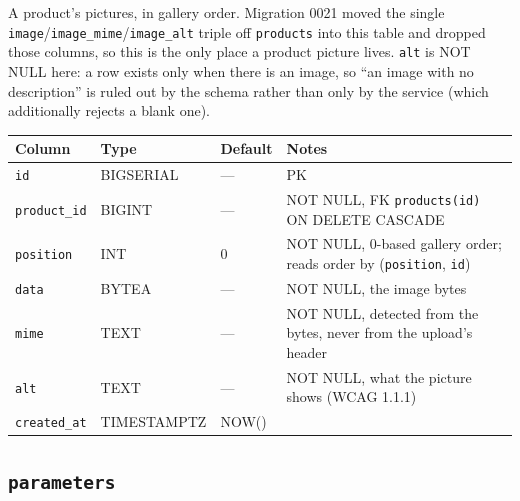 \documentclass[12pt,a4paper,twoside]{report}
\newcommand{\code}[1]{\texttt{#1}}
\begin{document}
A product's pictures, in gallery order. Migration 0021 moved the single
\code{image}/\code{image\_mime}/\code{image\_alt} triple off \code{products} into
this table and dropped those columns, so this is the only place a product picture
lives. \code{alt} is NOT NULL here: a row exists only when there is an image, so
``an image with no description'' is ruled out by the schema rather than only by the
service (which additionally rejects a blank one).

\begin{table}[H]
  \centering\small
  \begin{tabular}{@{}llll@{}}
    \toprule
    \textbf{Column} & \textbf{Type} & \textbf{Default} & \textbf{Notes} \\
    \midrule
    \code{id}         & BIGSERIAL & ---  & PK \\
    \code{product\_id}& BIGINT    & ---  & NOT NULL, FK \textrightarrow{} \code{products(id)} ON DELETE CASCADE \\
    \code{position}   & INT       & 0    & NOT NULL, 0-based gallery order; reads order by (\code{position}, \code{id}) \\
    \code{data}       & BYTEA     & ---  & NOT NULL, the image bytes \\
    \code{mime}       & TEXT      & ---  & NOT NULL, detected from the bytes, never from the upload's header \\
    \code{alt}        & TEXT      & ---  & NOT NULL, what the picture shows (WCAG 1.1.1) \\
    \code{created\_at}& TIMESTAMPTZ & NOW() & \\
    \bottomrule
  \end{tabular}
\end{table}

\subsection*{\texttt{parameters}}
\end{document}
